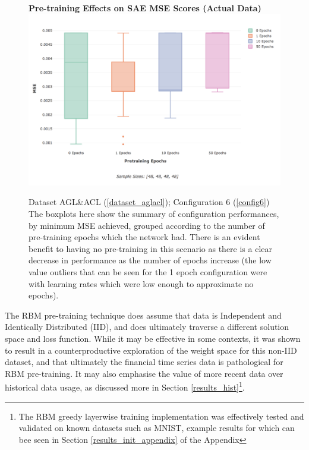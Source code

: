 \documentclass[a4paper,11pt,oneside]{article}
\theoremstyle{plain}
\theoremstyle{definition}
\begin{document}
\begin{figure}[H]
	\centering
	\textbf{Pre-training Effects on SAE MSE Scores (Actual Data)} 
	\includegraphics[scale=0.45]{images/results/newinit/actual_sigmoid_pt.png}
	\caption[Pre-training Effects on SAE MSE Scores (Actual Data)]{Dataset AGL\&ACL (\ref{dataset_aglacl}); Configuration 6 (\ref{config6})
		\newline \newline The boxplots here show the summary of configuration performances, by minimum MSE achieved, grouped according to the number of pre-training epochs which the network had. There is an evident benefit to having no pre-training in this scenario as there is a clear decrease in performance as the number of epochs increase (the low value outliers that can be seen for the 1 epoch configuration were with learning rates which were low enough to approximate no epochs).}
	\label{figure-results-pretraining-effect}
\end{figure}		

The RBM pre-training technique does assume that data is Independent and Identically Distributed (IID), and does ultimately traverse a different solution space and loss function. While it may be effective in some contexts, it was shown to result in a counterproductive exploration of the weight space for this non-IID dataset, and that ultimately the financial time series data is pathological for RBM pre-training. It may also emphasise the value of more recent data over historical data usage, as discussed more in Section \ref{results_hist}\footnote{The RBM greedy layerwise training implementation was effectively tested and validated on known datasets such as MNIST, example results for which can bee seen in Section \ref{results_init_appendix} of the Appendix}.\newline 
\end{document}
